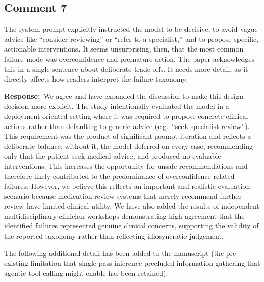 \documentclass[11pt,a4paper]{article}
\newcounter{rcomment}
\newcommand{\response}{\noindent\textbf{Response:}\ }
\begin{document}
\subsection*{Comment 7}
\begin{reviewercomment}
The system prompt explicitly instructed the model to be decisive, to avoid vague advice like ``consider reviewing'' or ``refer to a specialist,'' and to propose specific, actionable interventions. It seems unsurprising, then, that the most common failure mode was overconfidence and premature action. The paper acknowledges this in a single sentence about deliberate trade-offs. It needs more detail, as it directly affects how readers interpret the failure taxonomy.
\end{reviewercomment}

\response We agree and have expanded the discussion to make this design decision more explicit. The study intentionally evaluated the model in a deployment-oriented setting where it was required to propose concrete clinical actions rather than defaulting to generic advice (e.g.\ ``seek specialist review''). This requirement was the product of significant prompt iteration and reflects a deliberate balance: without it, the model deferred on every case, recommending only that the patient seek medical advice, and produced no evaluable interventions. This increases the opportunity for unsafe recommendations and therefore likely contributed to the predominance of overconfidence-related failures. However, we believe this reflects an important and realistic evaluation scenario because medication review systems that merely recommend further review have limited clinical utility. We have also added the results of independent multidisciplinary clinician workshops demonstrating high agreement that the identified failures represented genuine clinical concerns, supporting the validity of the reported taxonomy rather than reflecting idiosyncratic judgement.

The following additional detail has been added to the manuscript (the pre-existing limitation that single-pass inference precluded information-gathering that agentic tool calling might enable has been retained):
\end{document}
